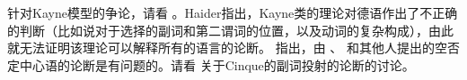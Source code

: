 针对Kayne模型的争论，请看 。Haider指出，Kayne类的理论对德语作出了不正确的判断（比如说对于选择的副词和第二谓词的位置，以及动词的复杂构成），由此就无法证明该理论可以解释所有的语言的论断。 \citet[\S~4]{Haider97a}指出，由 \citet{Pollock89a-u}、 \citet{Haegeman95a-u}和其他人提出的空否定中心语的论断是有问题的。请看 关于Cinque的副词投射的论断的讨论。


